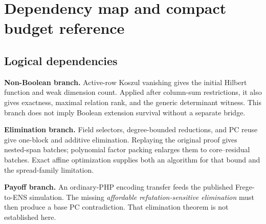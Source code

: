 \chapter{Dependency map and compact budget reference}\label{app:map}
\section{Logical dependencies}
\textbf{Non-Boolean branch.} Active-row Koszul vanishing gives the initial Hilbert function and weak dimension count. Applied after column-sum restrictions, it also gives exactness, maximal relation rank, and the generic determinant witness. This branch does not imply Boolean extension survival without a separate bridge.

\textbf{Elimination branch.} Field selectors, degree-bounded reductions, and PC reuse give one-block and additive elimination. Replaying the original proof gives nested-span batches; polynomial factor packing enlarges them to core--residual batches. Exact affine optimization supplies both an algorithm for that bound and the spread-family limitation.

\textbf{Payoff branch.} An ordinary-PHP encoding transfer feeds the published Frege-to-ENS simulation. The missing \emph{affordable refutation-sensitive elimination} must then produce a base PC contradiction. That elimination theorem is not established here.


